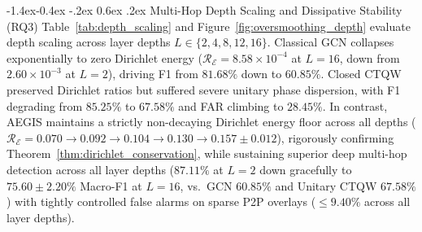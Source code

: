 \documentclass[10pt,twocolumn,letterpaper]{article}
\makeatletter
\renewcommand\subsection{\@startsection{subsection}{2}{\z@}%
                                     {-1.4ex\@plus -0.4ex \@minus -.2ex}%
                                     {0.6ex \@plus .2ex}%
                                     {\normalfont\normalsize\bfseries}}
\makeatother
\begin{document}
\begin{table}[t]
\centering
\caption{CTU-13 Scenario 10 Detection Resilience (Macro-F1 \%) Across Camouflage Intensities $\alpha \in [0.00, 1.00]$}
\label{tab:camouflage_ctu10}
\small
{}
\end{table}

\subsection{Multi-Hop Depth Scaling and Dissipative Stability (RQ3)}
Table~\ref{tab:depth_scaling} and Figure~\ref{fig:oversmoothing_depth} evaluate depth scaling across layer depths $L \in \{2, 4, 8, 12, 16\}$. Classical GCN collapses exponentially to zero Dirichlet energy ($\mathcal{R}_{\mathcal{E}} = 8.58 \times 10^{-4}$ at $L=16$, down from $2.60 \times 10^{-3}$ at $L=2$), driving F1 from $81.68\%$ down to $60.85\%$. Closed CTQW preserved Dirichlet ratios but suffered severe unitary phase dispersion, with F1 degrading from $85.25\%$ to $67.58\%$ and FAR climbing to $28.45\%$. In contrast, AEGIS maintains a strictly non-decaying Dirichlet energy floor across all depths ($\mathcal{R}_{\mathcal{E}} = 0.070 \to 0.092 \to 0.104 \to 0.130 \to 0.157 \pm 0.012$), rigorously confirming Theorem~\ref{thm:dirichlet_conservation}, while sustaining superior deep multi-hop detection across all layer depths ($87.11\%$ at $L=2$ down gracefully to $\mathbf{75.60 \pm 2.20\%}$ Macro-F1 at $L=16$, vs.\ GCN $60.85\%$ and Unitary CTQW $67.58\%$) with tightly controlled false alarms on sparse P2P overlays ($\le 9.40\%$ across all layer depths).
\end{document}
